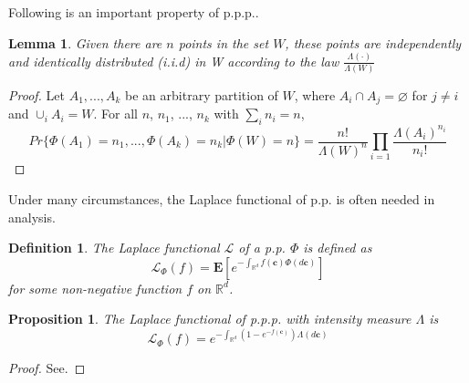 \documentclass[a4paper,onecolumn,11pt]{IEEEtran}
\newtheorem{definition}{\textbf{Definition}}
\newtheorem{proposition}{\textbf{Proposition}}
\newtheorem{lemma}{\textbf{Lemma}}
\begin{document}
Following is an important property of p.p.p..
\begin{lemma}
	Given there are $n$ points in the set $W$, these points are independently and identically distributed (i.i.d) in W according to the law $\frac{\Lambda(\cdot)}{\Lambda(W)}$
\end{lemma}
\begin{proof}
	Let $A_1, ..., A_k$ be an arbitrary partition of $W$, where $A_i \cap A_j = \varnothing$ for $j \neq i$ and $\cup_i A_i = W$. For all $n$, $n_1$, ..., $n_k$ with $\sum_i n_i = n$,
	\begin{displaymath}
	Pr\{\Phi(A_1) = n_1, ..., \Phi(A_k) = n_k | \Phi(W) = n\} = \frac{n!}{\Lambda(W)^n}\prod_{i=1}\frac{\Lambda(A_i)^{n_i}}{n_i!}
	\end{displaymath}
\end{proof}

Under many circumstances, the Laplace functional of p.p. is often needed in analysis.
\begin{definition}
The Laplace functional $\mathcal{L}$ of a p.p. $\Phi$ is defined as
\begin{displaymath}
\mathcal{L}_{\Phi}(f) = \mathbf{E}\left[ e^{-\int_{\mathbb{R}^d} f(\bm{c}) \Phi(d \bm{c})}\right]
\end{displaymath}
for some non-negative function $f$ on $\mathbb{R}^d$.
\end{definition}
\begin{proposition}
The Laplace functional of p.p.p. with intensity measure $\Lambda$ is
\begin{equation}
\mathcal{L}_{\Phi}(f) = e^{-\int_{\mathbb{R}^d}(1-e^{-f(\bm{c})})\Lambda(d \bm{c})}
\end{equation}
\end{proposition}
\begin{proof}
See.
\end{proof}
\end{document}
